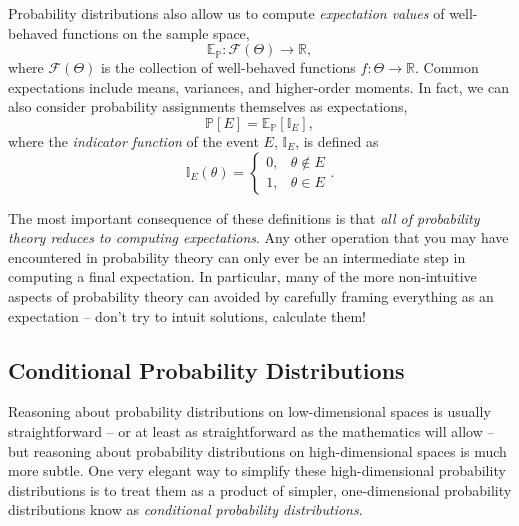 \documentclass[11pt, oneside]{article}
\newcommand{\PP}{ \mathbb{P} }
\newcommand{\EE}{ \mathbb{E} }
\begin{document}
Probability distributions also allow us to compute \emph{expectation values} 
of well-behaved functions on the sample space,
%
\begin{equation*}
\EE_{\PP} : \mathcal{F} \! \left( \Theta \right) \rightarrow \mathbb{R},
\end{equation*}
%
where $\mathcal{F} \! \left( \Theta \right)$ is the collection of well-behaved 
functions $f : \Theta \rightarrow \mathbb{R}$.  Common expectations 
include means, variances, and higher-order moments.  In fact, we
can also consider probability assignments themselves as expectations,
%
\begin{equation*}
\PP \! \left[ E \right] = \EE_{\PP} \! \left[ \mathbb{I}_{E} \right],
\end{equation*}
%
where the \emph{indicator function} of the event $E$, $\mathbb{I}_{E}$,
is defined as
%
\begin{equation*}
\mathbb{I}_{E} \! \left( \theta \right)
= 
\left\{
\begin{array}{rr}
0, & \theta \notin E \\
1, & \theta \in E
\end{array}
\right. .
\end{equation*}

The most important consequence of these definitions is that \emph{all of 
probability theory reduces to computing expectations}.  Any other operation 
that you may have encountered in probability theory can only ever be an
intermediate step in computing a final expectation.  In particular, many of 
the more non-intuitive aspects of probability theory can avoided by carefully
framing everything as an expectation -- don't try to intuit solutions, calculate 
them!

\subsection{Conditional Probability Distributions}

Reasoning about probability distributions on low-dimensional spaces
is usually straightforward -- or at least as straightforward as the
mathematics will allow -- but reasoning about probability distributions
on high-dimensional spaces is much more subtle.  One
very elegant way to simplify these high-dimensional probability
distributions is to treat them as a product of simpler, one-dimensional
probability distributions know as \emph{conditional probability
distributions}.
\end{document}
